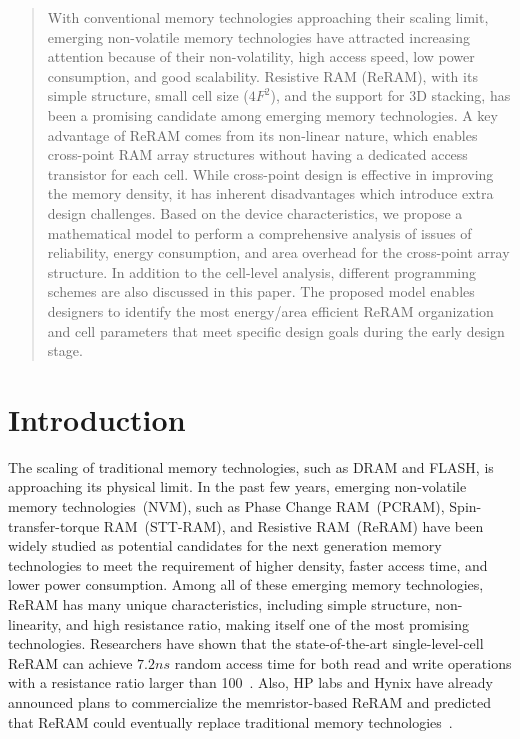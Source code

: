 \begin{abstract}
With conventional memory technologies approaching their scaling limit,
emerging non-volatile memory technologies have attracted increasing%
attention because of their non-volatility, high access speed, low power
consumption, and good scalability. Resistive RAM (ReRAM), with its simple
structure, small cell size ($4F^2$), and the support for 3D stacking, has been
a promising candidate among emerging memory technologies.
A key advantage of ReRAM
comes from its non-linear nature, which enables  cross-point
RAM array structures without having a dedicated access transistor for each cell. While
cross-point design is effective in improving the memory density, it has
inherent disadvantages which introduce extra design challenges. Based on
the device characteristics, we propose a
mathematical model to perform a comprehensive analysis of issues of
reliability, energy consumption, and area overhead for the cross-point array structure. In addition to the
cell-level analysis, different programming schemes are also discussed in
this paper. The proposed model enables designers to identify the most
energy/area efficient ReRAM organization and cell parameters that meet
specific design goals during the early design stage.
\end{abstract}

\section{Introduction}\label{sec:intro}
The scaling of traditional memory technologies, such as DRAM and FLASH, is
approaching its physical limit. In the past few years, emerging
non-volatile memory technologies~(NVM), such as Phase Change RAM~(PCRAM),
Spin-transfer-torque RAM~(STT-RAM), and Resistive RAM~(ReRAM) have been
widely studied as potential candidates for the next generation memory
technologies to meet the requirement of higher density, faster access
time, and lower power consumption. Among all of these emerging memory
technologies, ReRAM has many unique characteristics, including simple
structure, non-linearity,  and high resistance ratio, making itself one of
the most promising technologies. Researchers have shown that the
state-of-the-art single-level-cell ReRAM can achieve $7.2ns$ random access
time for both read and write operations with a resistance ratio larger
than 100~\cite{ReRAM_ISSCC2011_Sheu}. Also, HP labs and Hynix have already
announced plans to commercialize the memristor-based ReRAM and predicted
that ReRAM could eventually replace traditional memory
technologies~\cite{memristor:HpHynix}.

